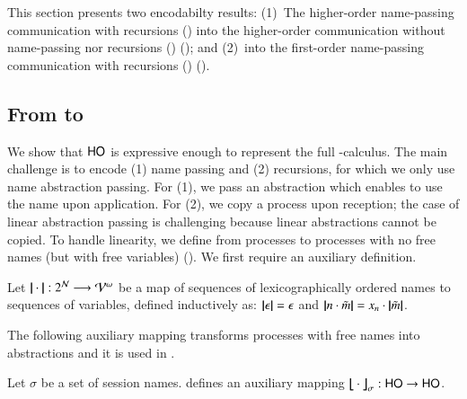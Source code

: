 \noi This section presents two encodabilty results:
(1)~The higher-order name-passing communication with recursions (\HOp) into 
the higher-order communication without name-passing nor 
recursions (\HO) (); and 
(2)~\HOp into the first-order name-passing communication
with recursions (\sessp) (). 

 


\subsection{From \HOp to \HO}
\label{subsec:HOpi_to_HO}
\noi We show that $\mathsf{HO}$ is expressive enough to
represent the full
 \HOp-calculus.
The main challenge is to encode (1) name passing 
and (2) recursions, 
for which 
we only use name abstraction passing. For (1), we pass  
an %
abstraction which enables to use the name upon application. 
For (2), we 
copy a process upon reception; the case of linear abstraction passing
is challenging
because 
linear abstractions cannot be copied.
To handle linearity, we define 
from processes  to processes with no free names (but with free variables) (). 
We first require an auxiliary definition.

\smallskip 

\begin{definition}\rm 
\label{def:hop_to_ho}
	Let $|\!|\cdot|\!|: 2^{\mathcal{N}} \longrightarrow \mathcal{V}^\omega$
	be a map of sequences of 
lexicographically ordered names to sequences of variables, defined
	inductively as: 
	$|\!|\epsilon|\!| = \epsilon$ and $|\!|n \cdot \tilde{m}|\!| = x_n \cdot |\!|\tilde{m}|\!|$. 
\end{definition}

\smallskip 

\noi The following auxiliary mapping transforms processes
with free names into abstractions and it is
used in .

\smallskip 

\begin{definition} \label{d:trabs}\label{d:auxmap}
	Let $\sigma$ be a set of session names.
	 defines an auxiliary mapping
	$\big\lfloor\!\!\big\lfloor\cdot\big\rfloor\!\!\big\rfloor^{}_\sigma: \mathsf{HO} \to \mathsf{HO}$.
\end{definition}

